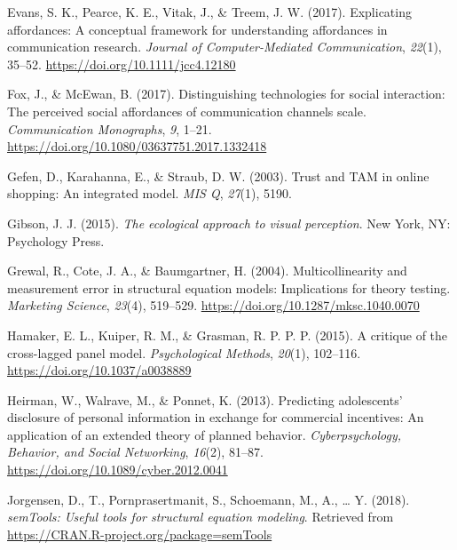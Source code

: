 \documentclass[
  english,
  man,floatsintext]{apa6}
\begin{document}
\leavevmode\hypertarget{ref-evansExplicatingAffordancesConceptual2017}{}%
Evans, S. K., Pearce, K. E., Vitak, J., \& Treem, J. W. (2017). Explicating affordances: A conceptual framework for understanding affordances in communication research. \emph{Journal of Computer-Mediated Communication}, \emph{22}(1), 35--52. \url{https://doi.org/10.1111/jcc4.12180}

\leavevmode\hypertarget{ref-foxDistinguishingTechnologiesSocial2017}{}%
Fox, J., \& McEwan, B. (2017). Distinguishing technologies for social interaction: The perceived social affordances of communication channels scale. \emph{Communication Monographs}, \emph{9}, 1--21. \url{https://doi.org/10.1080/03637751.2017.1332418}

\leavevmode\hypertarget{ref-gefenTrustTAMOnline2003}{}%
Gefen, D., Karahanna, E., \& Straub, D. W. (2003). Trust and TAM in online shopping: An integrated model. \emph{MIS Q}, \emph{27}(1), 5190.

\leavevmode\hypertarget{ref-gibsonEcologicalApproachVisual2015}{}%
Gibson, J. J. (2015). \emph{The ecological approach to visual perception}. New York, NY: Psychology Press.

\leavevmode\hypertarget{ref-grewalMulticollinearityMeasurementError2004}{}%
Grewal, R., Cote, J. A., \& Baumgartner, H. (2004). Multicollinearity and measurement error in structural equation models: Implications for theory testing. \emph{Marketing Science}, \emph{23}(4), 519--529. \url{https://doi.org/10.1287/mksc.1040.0070}

\leavevmode\hypertarget{ref-hamakerCritiqueCrosslaggedPanel2015}{}%
Hamaker, E. L., Kuiper, R. M., \& Grasman, R. P. P. P. (2015). A critique of the cross-lagged panel model. \emph{Psychological Methods}, \emph{20}(1), 102--116. \url{https://doi.org/10.1037/a0038889}

\leavevmode\hypertarget{ref-heirmanPredictingAdolescentsDisclosure2013}{}%
Heirman, W., Walrave, M., \& Ponnet, K. (2013). Predicting adolescents' disclosure of personal information in exchange for commercial incentives: An application of an extended theory of planned behavior. \emph{Cyberpsychology, Behavior, and Social Networking}, \emph{16}(2), 81--87. \url{https://doi.org/10.1089/cyber.2012.0041}

\leavevmode\hypertarget{ref-R-semTools}{}%
Jorgensen, D., T., Pornprasertmanit, S., Schoemann, M., A., \ldots{} Y. (2018). \emph{semTools: Useful tools for structural equation modeling}. Retrieved from \url{https://CRAN.R-project.org/package=semTools}
\end{document}

